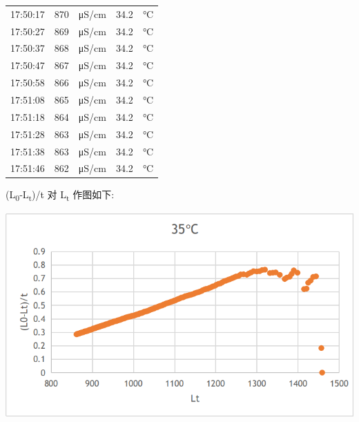 \documentclass[11pt]{article}
\begin{document}
\begin{enumerate}
\begin{center}
\begin{tabular}{rrlrl}
17:50:17 & 870 & μS/cm & 34.2 & °C\\
17:50:27 & 869 & μS/cm & 34.2 & °C\\
17:50:37 & 868 & μS/cm & 34.2 & °C\\
17:50:47 & 867 & μS/cm & 34.2 & °C\\
17:50:58 & 866 & μS/cm & 34.2 & °C\\
17:51:08 & 865 & μS/cm & 34.2 & °C\\
17:51:18 & 864 & μS/cm & 34.2 & °C\\
17:51:28 & 863 & μS/cm & 34.2 & °C\\
17:51:38 & 863 & μS/cm & 34.2 & °C\\
17:51:46 & 862 & μS/cm & 34.2 & °C\\
\end{tabular}
\end{center}

(L\textsubscript{0}‐L\textsubscript{t})/t 对 L\textsubscript{t} 作图如下:
\begin{center}
\includegraphics[width=.9\linewidth]{../img/picture-35-1.png}
\end{center}
\end{enumerate}
\end{document}
